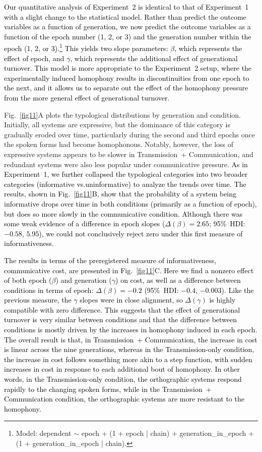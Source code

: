 \documentclass[doc,biblatex]{apa7}
\newcommand\firstrevision[1]{\textcolor{black}{#1}}
\newcommand\secondrevision[1]{\textcolor{black}{#1}}
\begin{document}
\firstrevision{Our quantitative analysis of Experiment~2 is identical to that of Experiment~1 with a slight change to the statistical model. Rather than predict the outcome variables as a function of generation, we now predict the outcome variables as a function of the epoch number (1, 2, or 3) and the generation number within the epoch (1, 2, or 3).\footnote{Model: dependent $\sim$ epoch + (1 + epoch | chain) + generation\_in\_epoch + (1 + generation\_in\_epoch | chain).} This yields two slope parameters: $\beta$, which represents the effect of epoch, and $\gamma$, which represents the additional effect of generational turnover. This model is more appropriate to the Experiment~2 setup, where the experimentally induced homophony results in discontinuities from one epoch to the next, and it allows us to separate out the effect of the homophony pressure from the more general effect of generational turnover.}

Fig.~\ref{fig11}A plots the typological distributions by generation and condition. Initially, all systems are expressive, but the dominance of this category is gradually eroded over time, particularly during the second and third epochs once the spoken forms had become homophonous. Notably, however, the loss of expressive systems appears to be slower in Transmission~+ Communication, and redundant systems were also less popular under communicative pressure. \firstrevision{As in Experiment~1, we further collapsed the typological categories into two broader categories (informative vs.\@ uninformative) to analyze the trends over time. The results, shown in Fig.~\ref{fig11}B, show that the probability of a system being informative drops over time in both conditions (primarily as a function of epoch), but does so more slowly in the communicative condition. Although there was some weak evidence of a difference in epoch slopes ($\Delta(\beta) = 2.65$; 95\%~HDI: $-0.58$, $5.95$), we could not conclusively reject zero under this first measure of informativeness.}

\firstrevision{The results in terms of the preregistered measure of informativeness, communicative cost, are presented in Fig.~\ref{fig11}C. Here we find a nonzero effect of both epoch \secondrevision{($\beta$)} and generation \secondrevision{($\gamma$)} on cost, as well as a difference between conditions in terms of epoch: $\Delta(\beta) = -0.2$ (95\%~HDI: $-0.4$, $-0.003$). Like the previous measure, the $\gamma$ slopes were in close alignment\secondrevision{, so $\Delta(\gamma)$ is highly compatible with zero difference}. This suggests that the effect of generational turnover is very similar between conditions and that the difference between conditions is mostly driven by the increases in homophony induced in each epoch. The overall result is that, in Transmission~+ Communication, the increase in cost is linear across the nine generations, whereas in the Transmission-only condition, the increase in cost follows something more akin to a step function, with sudden increases in cost in response to each additional bout of homophony. In other words, in the Transmission-only condition, the orthographic systems respond rapidly to the changing spoken forms, while in the Transmission~+ Communication condition, the orthographic systems are more resistant to the homophony.}
\end{document}
